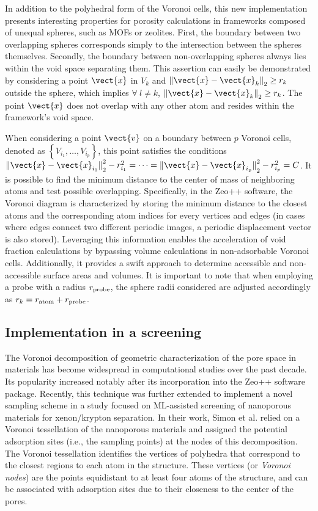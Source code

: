 \documentclass[main]{subfiles}
\begin{document}
In addition to the polyhedral form of the Voronoi cells, this new implementation presents interesting properties for porosity calculations in frameworks composed of unequal spheres, such as MOFs or zeolites.\autocite{voronoi_radical} First, the boundary between two overlapping spheres corresponds simply to the intersection between the spheres themselves. Secondly, the boundary between non-overlapping spheres always lies within the void space separating them. This assertion can easily be demonstrated by considering a point $\vect{x}$ in $V_{k}$ and ${\lVert \vect{x}-\vect{x}_k \rVert}_2 \geq r_k$ outside the sphere, which implies $\forall\ l\neq k$, ${\lVert \vect{x}-\vect{x}_k \rVert}_2 \geq r_k$. The point $\vect{x}$ does not overlap with any other atom and resides within the framework's void space.

When considering a point $\vect{v}$ on a boundary between $p$ Voronoi cells, denoted as $\left\{V_{i_1},\ldots,V_{i_p}\right\}$, this point satisfies the conditions ${\lVert \vect{x}-\vect{x}_{i_1} \rVert}_2^2 - r_{i_1}^2 = \cdots = {\lVert \vect{x}-\vect{x}_{i_p} \rVert}_2^2 - r_{i_p}^2 = C$. It is possible to find the minimum distance to the center of mass of neighboring atoms and test possible overlapping. Specifically, in the Zeo++ software,\autocite{Zeo++} the Voronoi diagram is characterized by storing the minimum distance to the closest atoms and the corresponding atom indices for every vertices and edges (in cases where edges connect two different periodic images, a periodic displacement vector is also stored). Leveraging this information enables the acceleration of void fraction calculations by bypassing volume calculations in non-adsorbable Voronoi cells. Additionally, it provides a swift approach to determine accessible and non-accessible surface areas and volumes.\autocite{Zeo++} It is important to note that when employing a probe with a radius $r_{\text{probe}}$, the sphere radii considered are adjusted accordingly as $r_k = r_{\text{atom}}+r_{\text{probe}}$.

\subsection{Implementation in a screening}


The Voronoi decomposition of geometric characterization of the pore space in materials has become widespread in computational studies over the past decade.\autocite{Willems_2012} Its popularity increased notably after its incorporation into the Zeo++ software package.\autocite{Pinheiro2013} Recently, this technique was further extended to implement a novel sampling scheme in a study focused on ML-assisted screening of nanoporous materials for xenon/krypton separation. In their work, Simon et al.\autocite{Simon_2015} relied on a Voronoi tessellation of the nanoporous materials and assigned the potential adsorption sites (i.e., the sampling points) at the nodes of this decomposition. The Voronoi tessellation identifies the vertices of polyhedra that correspond to the closest regions to each atom in the structure. These vertices (or \emph{Voronoi nodes}) are the points equidistant to at least four atoms of the structure, and can be associated with adsorption sites due to their closeness to the center of the pores. 
\end{document}
